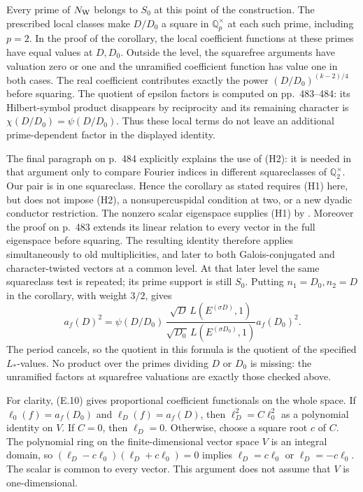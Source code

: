 Every prime of $N_{\rm W}$ belongs to $S_0$ at this point of the
construction. The prescribed local classes make $D/D_0$ a square
in $\mathbb Q_p^\times$ at each such prime, including $p=2$.
In the proof of the corollary, the local coefficient functions
at these primes have equal values at $D,D_0$. Outside the level,
the squarefree arguments have valuation zero or one and the
unramified coefficient function has value one in both cases.
The real coefficient contributes exactly the power
$(D/D_0)^{(k-2)/4}$ before squaring. The quotient of epsilon
factors is computed on pp.~483--484: its Hilbert-symbol product
disappears by reciprocity and its remaining character is
$\chi(D/D_0)=\psi(D/D_0)$. Thus these local terms do not leave
an additional prime-dependent factor in the displayed identity.

The final paragraph on p.~484 explicitly explains the use of
(H2): it is needed in that argument only to compare Fourier
indices in different squareclasses of $\mathbb Q_2^\times$.
Our pair is in one squareclass. Hence the corollary as stated
requires (H1) here, but does not impose (H2), a nonsupercuspidal
condition at two, or a new dyadic conductor restriction. The
nonzero scalar eigenspace supplies (H1) by
\cite[Proposition~2, p.~377]{waldspurger}. Moreover the proof on
p.~483 extends its linear relation to every vector in the full
eigenspace before squaring. The resulting identity therefore
applies simultaneously to old multiplicities, and later to both
Galois-conjugated and character-twisted vectors at a common level.
At that later level the same squareclass test is repeated; its
prime support is still $S_0$.
Putting $n_1=D_0,n_2=D$ in the corollary, with weight $3/2$, gives
\[
 a_f(D)^2=
 \psi(D/D_0)\,
 \frac{\sqrt D\,L(E^{(\sigma D)},1)}
      {\sqrt{D_0}\,L(E^{(\sigma D_0)},1)}
 a_f(D_0)^2.                                      \tag{E.10}
\]
The period cancels, so the quotient in this formula is the quotient
of the specified $L_*$-values. No product over the primes dividing
$D$ or $D_0$ is missing: the unramified factors at squarefree
valuations are exactly those checked above.

For clarity, (E.10) gives proportional coefficient functionals on
the whole space. If $\ell_0(f)=a_f(D_0)$ and $\ell_D(f)=a_f(D)$,
then $\ell_D^2=C\ell_0^2$ as a polynomial identity on $V$.
If $C=0$, then $\ell_D=0$. Otherwise, choose a square root $c$ of
$C$. The polynomial ring on the finite-dimensional vector space
$V$ is an integral domain, so
$(\ell_D-c\ell_0)(\ell_D+c\ell_0)=0$ implies
$\ell_D=c\ell_0$ or $\ell_D=-c\ell_0$.
The scalar is common to every vector. This argument does not
assume that $V$ is one-dimensional.
